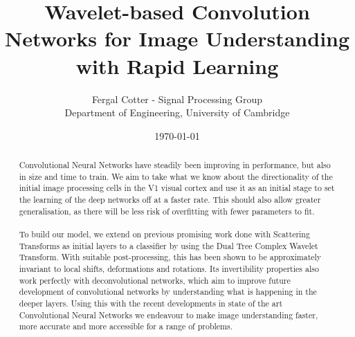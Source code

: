 \documentclass[12pt, a4paper, oneside, english]{article}
\begin{document}
\title{Wavelet-based Convolution Networks for Image Understanding with Rapid Learning}
\date{\today}
\author{Fergal Cotter - Signal Processing Group\\
Department of Engineering, University of Cambridge}

\maketitle
\begin{abstract}
\noindent Convolutional Neural Networks have steadily been improving in performance, but also in size and time to train. We aim to take what we know about the directionality of the initial image processing cells in the V1 visual cortex and use it as an initial stage to set the learning of the deep networks off at a faster rate. This should also allow greater generalisation, as there will be less risk of overfitting with fewer parameters to fit. \\\\To build our model, we extend on previous promising work done with Scattering Transforms as initial layers to a classifier by using the Dual Tree Complex Wavelet Transform. With suitable post-processing, this has been shown to be approximately invariant to local shifts, deformations and rotations. Its invertibility properties also work perfectly with deconvolutional networks, which aim to improve future development of convolutional networks by understanding what is happening in the deeper layers. Using this with the recent developments in state of the art Convolutional Neural Networks we endeavour to make image understanding faster, more accurate and more accessible for a range of problems.
\end{abstract}

\end{document}
